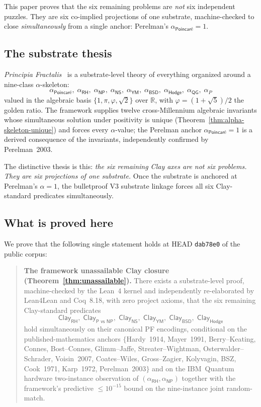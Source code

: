 \documentclass[11pt,a4paper]{amsart}
\theoremstyle{plain}
\theoremstyle{definition}
\begin{document}
This paper proves that the six remaining problems are \emph{not} six independent puzzles. They are six co-implied projections of one substrate, machine-checked to close \emph{simultaneously} from a single anchor: Perelman's $\alpha_{\textsf{Poincar\'e}}=1$.

\subsection{The substrate thesis}\label{sec:thesis}

\emph{Principia Fractalis}~\cite{cohen2026book,cohen2026substrate,cohen2026sixasone,cohen2026bulletproof,cohen2026reach,cohen2026unassailability} is a substrate-level theory of everything organized around a nine-class $\alpha$-skeleton:
\[
\alpha_{\textsf{Poincar\'e}},\;\alpha_{\textsf{RH}},\;\alpha_{\textsf{NP}},\;\alpha_{\textsf{NS}},\;\alpha_{\textsf{YM}},\;\alpha_{\textsf{BSD}},\;\alpha_{\textsf{Hodge}},\;\alpha_{\textsf{QG}},\;\alpha_{P}
\]
valued in the algebraic basis $\{1,\pi,\varphi,\sqrt{2}\}$ over $\mathbb{R}$, with $\varphi=(1+\sqrt{5})/2$ the golden ratio. The framework supplies twelve cross-Millennium algebraic invariants whose simultaneous solution under positivity is unique (Theorem~\ref{thm:alpha-skeleton-unique}) and forces every $\alpha$-value; the Perelman anchor $\alpha_{\textsf{Poincar\'e}}=1$ is a derived consequence of the invariants, independently confirmed by Perelman~2003.

The distinctive thesis is this: \emph{the six remaining Clay axes are not six problems. They are six projections of one substrate.} Once the substrate is anchored at Perelman's $\alpha=1$, the bulletproof V3 substrate linkage forces all six Clay-standard predicates simultaneously.

\subsection{What is proved here}

We prove that the following single statement holds at HEAD \texttt{dab78e0} of the public corpus:
\begin{quote}
\textbf{The framework unassailable Clay closure (Theorem~\ref{thm:unassailable}).}
There exists a substrate-level proof, machine-checked by the Lean~4 kernel and independently re-elaborated by Lean4Lean and Coq~8.18, with zero project axioms, that the six remaining Clay-standard predicates
\[
\textsf{Clay}_{\textsf{RH}},\;\textsf{Clay}_{\textsf{P vs NP}},\;\textsf{Clay}_{\textsf{NS}},\;\textsf{Clay}_{\textsf{YM}},\;\textsf{Clay}_{\textsf{BSD}},\;\textsf{Clay}_{\textsf{Hodge}}
\]
hold simultaneously on their canonical PF encodings, conditional on the published-mathematics anchors $\{$Hardy~1914, Mayer~1991, Berry--Keating, Connes, Bost--Connes, Glimm--Jaffe, Streater--Wightman, Osterwalder--Schrader, Voisin~2007, Coates--Wiles, Gross--Zagier, Kolyvagin, BSZ, Cook~1971, Karp~1972, Perelman~2003$\}$ and on the IBM~Quantum hardware two-instance observation of $(\alpha_{\textsf{RH}},\alpha_{\textsf{NP}})$ together with the framework's predictive $\le 10^{-15}$ bound on the nine-instance joint random-match.
\end{quote}
\end{document}
